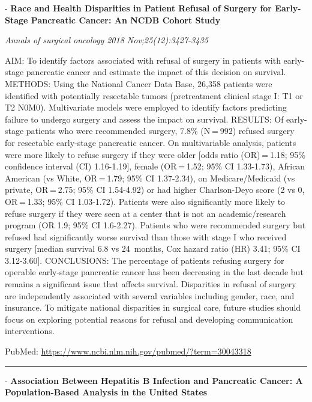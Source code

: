 \documentclass[]{article}
\begin{document}
 - \textbf{Race and Health Disparities in Patient Refusal of Surgery for
Early-Stage Pancreatic Cancer: An NCDB Cohort Study}

\emph{Annals of surgical oncology 2018 Nov;25(12):3427-3435}

AIM: To identify factors associated with refusal of surgery in patients
with early-stage pancreatic cancer and estimate the impact of this
decision on survival. METHODS: Using the National Cancer Data Base,
26,358 patients were identified with potentially resectable tumors
(pretreatment clinical stage I: T1 or T2 N0M0). Multivariate models were
employed to identify factors predicting failure to undergo surgery and
assess the impact on survival. RESULTS: Of early-stage patients who were
recommended surgery, 7.8\% (N = 992) refused surgery for resectable
early-stage pancreatic cancer. On multivariable analysis, patients were
more likely to refuse surgery if they were older {[}odds ratio
(OR) = 1.18; 95\% confidence interval (CI) 1.16-1.19{]}, female
(OR = 1.52; 95\% CI 1.33-1.73), African American (vs White, OR = 1.79;
95\% CI 1.37-2.34), on Medicare/Medicaid (vs private, OR = 2.75; 95\% CI
1.54-4.92) or had higher Charlson-Deyo score (2 vs 0, OR = 1.33; 95\% CI
1.03-1.72). Patients were also significantly more likely to refuse
surgery if they were seen at a center that is not an academic/research
program (OR 1.9; 95\% CI 1.6-2.27). Patients who were recommended
surgery but refused had significantly worse survival than those with
stage I who received surgery {[}median survival 6.8 vs 24~months, Cox
hazard ratio (HR) 3.41; 95\% CI 3.12-3.60{]}. CONCLUSIONS: The
percentage of patients refusing surgery for operable early-stage
pancreatic cancer has been decreasing in the last decade but remains a
significant issue that affects survival. Disparities in refusal of
surgery are independently associated with several variables including
gender, race, and insurance. To mitigate national disparities in
surgical care, future studies should focus on exploring potential
reasons for refusal and developing communication interventions.

PubMed: \url{https://www.ncbi.nlm.nih.gov/pubmed/?term=30043318}

{}

{}

\begin{center}\rule{0.5\linewidth}{\linethickness}\end{center}

 - \textbf{Association Between Hepatitis B Infection and Pancreatic
Cancer: A Population-Based Analysis in the United States}
\end{document}
